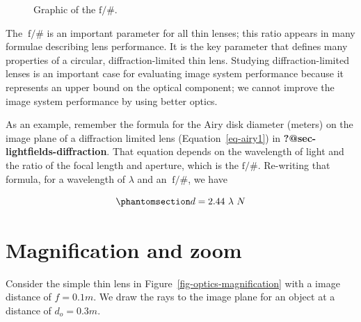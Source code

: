 \documentclass[
  letterpaper,
]{book}
\begin{document}
\begin{figure}


\caption{\label{fig-fnumber}Graphic of the \(\mathrm{f}/\#\).}

\end{figure}%

The \(~\mathrm{f}/\#\) is an important parameter for all thin lenses;
this ratio appears in many formulae describing lens performance. It is
the key parameter that defines many properties of a circular,
diffraction-limited thin lens. Studying diffraction-limited lenses is an
important case for evaluating image system performance because it
represents an upper bound on the optical component; we cannot improve
the image system performance by using better optics.

As an example, remember the formula for the Airy disk diameter (meters)
on the image plane of a diffraction limited lens
(Equation~\ref{eq-airy1}) in \textbf{?@sec-lightfields-diffraction}.
That equation depends on the wavelength of light and the ratio of the
focal length and aperture, which is the \(\mathrm{f}/\#\). Re-writing
that formula, for a wavelength of \(\lambda\) and an \(~\mathrm{f}/\#\),
we have

\begin{equation}\phantomsection\label{eq-airy2}{ 
d = 2.44 ~ \lambda ~ N
}\end{equation}

\section{Magnification and zoom}\label{sec-optics-zoom}

Consider the simple thin lens in Figure~\ref{fig-optics-magnification}
with a image distance of \(f = 0.1m\). We draw the rays to the image
plane for an object at a distance of \(d_o = 0.3m\).
\end{document}
